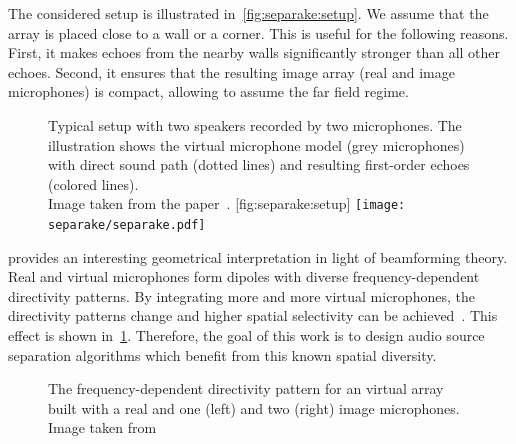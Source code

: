\mynewline
The considered setup is illustrated in~\cref{fig:separake:setup}.
We assume that the array is placed close to a wall or a corner. This is useful for the following reasons.
First, it makes echoes from the nearby walls significantly stronger than all other echoes.
Second, it ensures that the resulting image array (real and image microphones) is compact, allowing to assume the far field regime.

\begin{figure}[t]
    \begin{sidecaption}{%
        Typical setup with two speakers recorded by two microphones.
        The illustration shows the virtual microphone model (grey microphones) with direct sound path (dotted lines) and resulting first-order echoes (colored lines).
        \\Image taken from the paper~.
        }[fig:separake:setup]
    \centering
    \texttt{[image: separake/separake.pdf]}
    \end{sidecaption}
\end{figure}

 provides an interesting geometrical interpretation in light of beamforming theory.
Real and virtual microphones form dipoles with diverse frequency-dependent directivity patterns.
By integrating more and more virtual microphones, the directivity patterns change and higher spatial selectivity can be achieved~.
This effect is shown in~\cref{fig:separake:directivity}.
Therefore, the goal of this work is to design audio source separation algorithms which benefit from this known spatial diversity.
\begin{figure}[t]
    \begin{fullwidth}
    \centering
    \resizebox{\linewidth}{!}{
        
    }
    \label{fig:separake:directivity}
    \caption{The frequency-dependent directivity pattern for an virtual array built with a real and one (left) and two (right) image microphones.
    Image taken from }
    \end{fullwidth}
\end{figure}

